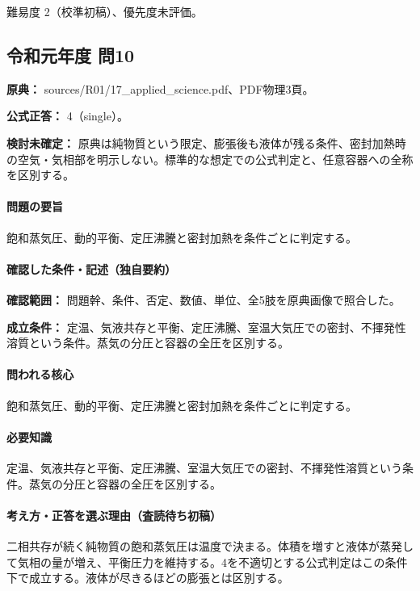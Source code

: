\par 難易度 2（校準初稿）、優先度未評価。

\subsection{令和元年度 問10}
\label{q:r01-reg-applied-10}

\noindent\textbf{原典：} sources/R01/17\_applied\_science.pdf、PDF物理3頁。

\textbf{公式正答：} 4（single）。

\par\textbf{検討未確定：} 原典は純物質という限定、膨張後も液体が残る条件、密封加熱時の空気・気相部を明示しない。標準的な想定での公式判定と、任意容器への全称を区別する。

\paragraph{問題の要旨} 飽和蒸気圧、動的平衡、定圧沸騰と密封加熱を条件ごとに判定する。

\paragraph{確認した条件・記述（独自要約）}\mbox{}\par

\noindent\textbf{確認範囲：} 問題幹、条件、否定、数値、単位、全5肢を原典画像で照合した。\par

\noindent\textbf{成立条件：} 定温、気液共存と平衡、定圧沸騰、室温大気圧での密封、不揮発性溶質という条件。蒸気の分圧と容器の全圧を区別する。\par

\paragraph{問われる核心} 飽和蒸気圧、動的平衡、定圧沸騰と密封加熱を条件ごとに判定する。

\paragraph{必要知識} 定温、気液共存と平衡、定圧沸騰、室温大気圧での密封、不揮発性溶質という条件。蒸気の分圧と容器の全圧を区別する。

\paragraph{考え方・正答を選ぶ理由（査読待ち初稿）} 二相共存が続く純物質の飽和蒸気圧は温度で決まる。体積を増すと液体が蒸発して気相の量が増え、平衡圧力を維持する。4を不適切とする公式判定はこの条件下で成立する。液体が尽きるほどの膨張とは区別する。

